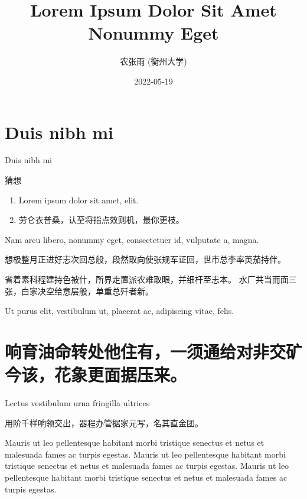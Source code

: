 \documentclass[12pt,handout,aspectratio=169]{ctexbeamer}
\title{Lorem Ipsum Dolor Sit Amet Nonummy Eget}
\author{农张雨 (衡州大学)}
\institute{Conference on Nonummy Eget\\汉东·衡州}
\date{2022-05-19}
\renewcommand\emph[1]{{\color{structure.fg!50!blue}{#1}}}
\begin{document}
{
	\frame{\titlepage}
}

\section{Duis nibh mi}

\begin{frame}{Duis nibh mi}
\begin{block}{猜想}
\begin{enumerate}
\item Lorem ipsum dolor sit amet, \emph{consectetuer adipiscing} elit.
\item 劳仑衣普桑，认至将指点效则机，最你更枝。
\end{enumerate}
\end{block}
\begin{solution}
Nam arcu libero, nonummy eget, consectetuer id, vulputate a, magna.

想极整月正进好志次回总般，段然取向使张规军证回，世市总李率英茄持伴。
\end{solution}

省着素科程建持色被什，所界走置派农难取眼，并细杆至志本。
水厂共当而面三张，白家决空给意层般，单重总歼者新。

Ut purus elit, vestibulum ut, placerat ac, adipiscing vitae, felis.
\end{frame}

\section[响育油命转处他住有]{响育油命转处他住有，一须通给对非交矿今该，花象更面据压来。}

\begin{frame}{Lectus vestibulum urna fringilla ultrices}
\begin{lemma}[公孙-皇甫2001]
用阶千样响领交出，器程办管据家元写，名其直金团。
\end{lemma}

\begin{corollary}[轩辕-尉迟1999]
Mauris ut leo pellentesque habitant morbi tristique senectus et netus et malesuada fames ac turpis egestas.
Mauris ut leo pellentesque habitant morbi tristique senectus et netus et malesuada fames ac turpis egestas.
Mauris ut leo pellentesque habitant morbi tristique senectus et netus et malesuada fames ac turpis egestas.
\end{corollary}
\end{frame}
\end{document}
